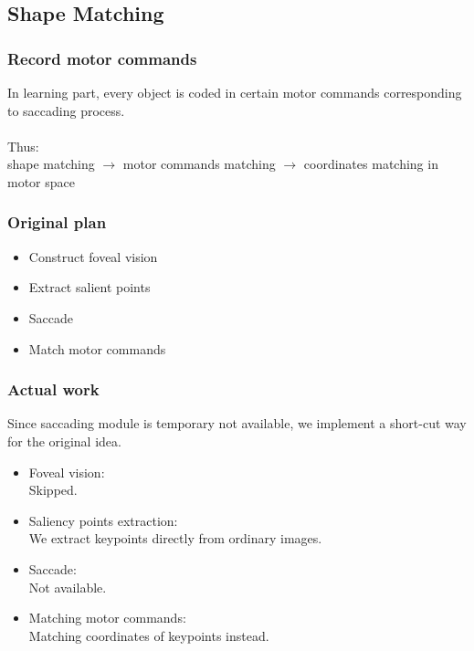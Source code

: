 \documentclass{beamer}
\begin{document}
\subsection{Shape Matching}

\begin{frame}
\frametitle{Record motor commands}
In learning part, every object is coded in certain motor commands corresponding to saccading process.
\\~\\
Thus:\\
shape matching $\to$ motor commands matching $\to$ coordinates matching in motor space

\end{frame}


\begin{frame}
\frametitle{Original plan}
\begin{itemize}
\item Construct foveal vision%
\item Extract salient points%
\item Saccade%
\item Match motor commands%
\end{itemize}
\end{frame}

\begin{frame}
\frametitle{Actual work}
Since saccading module is temporary not available, we implement a short-cut way for the original idea.\\

\begin{itemize}
\item Foveal vision:\\	
Skipped.
\item Saliency points extraction:\\
We extract keypoints directly from ordinary images.
\item Saccade:\\
Not available.
\item Matching motor commands:\\
Matching coordinates of keypoints instead. 
\end{itemize}
\end{frame}
\end{document}
